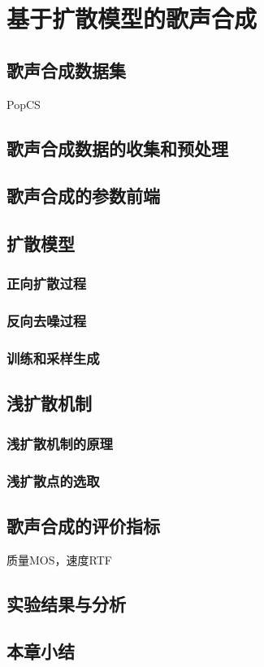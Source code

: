 \chapter{基于扩散模型的歌声合成}
\section{歌声合成数据集}
PopCS~
\section{歌声合成数据的收集和预处理}
\section{歌声合成的参数前端}
\section{扩散模型}
\subsection{正向扩散过程}
\subsection{反向去噪过程}
\subsection{训练和采样生成}
\section{浅扩散机制}
\subsection{浅扩散机制的原理}
\subsection{浅扩散点的选取}
\section{歌声合成的评价指标}
质量MOS，速度RTF
\section{实验结果与分析}
\section{本章小结}
